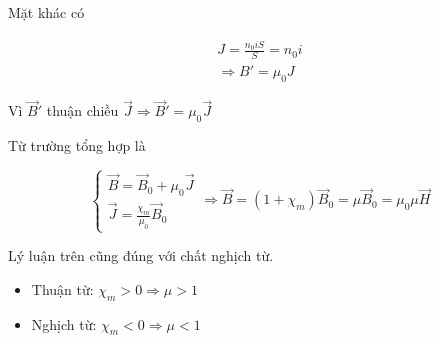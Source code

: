 Mặt khác có

\begin{gather*}
  J = \frac{n_0 i S}{S} = n_0 i \\
  \Rightarrow B' = \mu_0 J
\end{gather*}

Vì $\vec{B}'$ thuận chiều $\vec{J} \Rightarrow \vec{B}' = \mu_0 \vec{J}$

Từ trường tổng hợp là 

\begin{equation*}
  \begin{cases}
    \vec{B} = \vec{B}_0 + \mu_0 \vec{J} \\
    \vec{J} = \frac{\chi_m}{\mu_0} \vec{B}_0
  \end{cases}
  \Rightarrow \vec{B} = (1 + \chi_m) \vec{B}_0 = \mu \vec{B}_0 = \mu_0 \mu \vec{H}
\end{equation*}

Lý luận trên cũng đúng với chất nghịch từ.

\begin{itemize}
  \item Thuận từ: $\chi_m > 0 \Rightarrow \mu > 1$
  \item Nghịch từ: $\chi_m < 0 \Rightarrow \mu < 1$
\end{itemize}